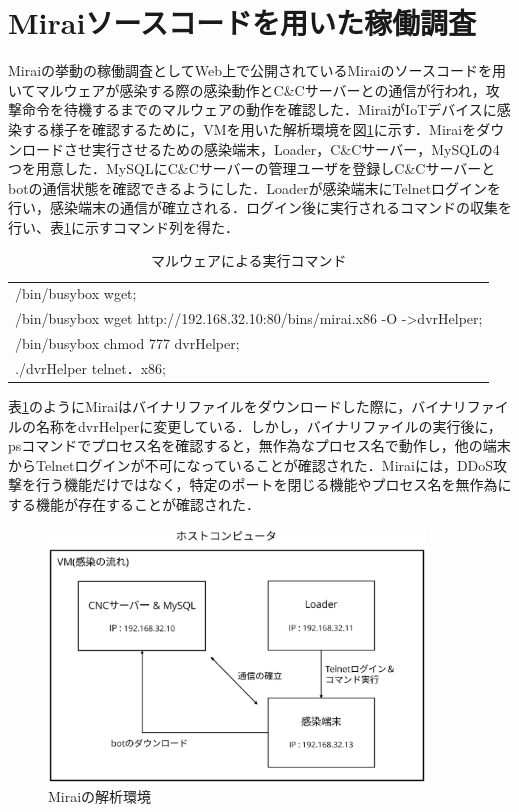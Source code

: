 \section{Miraiソースコードを用いた稼働調査}
Miraiの挙動の稼働調査としてWeb上で公開されているMiraiのソースコード\cite{code}を用いてマルウェアが感染する際の感染動作とC\&Cサーバーとの通信が行われ，攻撃命令を待機するまでのマルウェアの動作を確認した．MiraiがIoTデバイスに感染する様子を確認するために，VMを用いた解析環境を図\ref{fig:kaiseki}に示す．Miraiをダウンロードさせ実行させるための感染端末，Loader，C\&Cサーバー，MySQLの4つを用意した．MySQLにC\&Cサーバーの管理ユーザを登録しC\&Cサーバーとbotの通信状態を確認できるようにした．Loaderが感染端末にTelnetログインを行い，感染端末の通信が確立される．ログイン後に実行されるコマンドの収集を行い、表\ref{tab:malware}に示すコマンド列を得た．
\begin{table}[t]
   \caption{マルウェアによる実行コマンド}
   \label{tab:malware}
   \centering
\begin{tabular}{p{7cm}}
\hline
/bin/busybox wget;\\
/bin/busybox wget http://192.168.32.10:80/bins/mirai.x86 -O -\textgreater dvrHelper;\\
/bin/busybox chmod 777 dvrHelper;\\
./dvrHelper telnet．x86;\\
\hline
\end{tabular}
\end{table}
表\ref{tab:malware}のようにMiraiはバイナリファイルをダウンロードした際に，バイナリファイルの名称をdvrHelperに変更している．しかし，バイナリファイルの実行後に，psコマンドでプロセス名を確認すると，無作為なプロセス名で動作し，他の端末からTelnetログインが不可になっていることが確認された．Miraiには，DDoS攻撃を行う機能だけではなく，特定のポートを閉じる機能やプロセス名を無作為にする機能が存在することが確認された．
 \begin{figure}[h]
 \centering
    \includegraphics[width=100mm]{figures/VM.eps}
    \caption{Miraiの解析環境}
 \label{fig:kaiseki}
 \end{figure}
 \newpage


